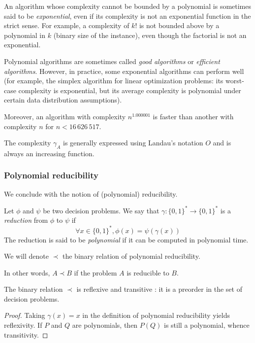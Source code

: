 An algorithm whose complexity cannot be bounded by a polynomial is sometimes said to be \textit{exponential}, even if its complexity is not an exponential function in the strict sense. For example, a complexity of $k!$ is not bounded above by a polynomial in $k$ (binary size of the instance), even though the factorial is not an exponential.

Polynomial algorithms are sometimes called \textit{good algorithms} or \textit{efficient algorithms}. However, in practice, some exponential algorithms can perform well (for example, the simplex algorithm for linear optimization problems: its worst-case complexity is exponential, but its average complexity is polynomial under certain data distribution assumptions).

Moreover, an algorithm with complexity $n^{1.000001}$ is faster than another with complexity $n$ for $n < 16\,626\,517$.

The complexity $\gamma_A$ is generally expressed using Landau’s notation $O$ and is always an increasing function.

\subsubsection{Polynomial reducibility}

We conclude with the notion of (polynomial) reducibility. 

\begin{definition}
    Let $ \phi $ and $ \psi $ be two decision problems. We say that $ \gamma : \{0,1\}^* \to \{0,1\}^* $ is a \textit{reduction} from $ \phi $ to $ \psi $ if 
    \[ 
        \forall x \in \{0,1\}^*, \phi(x) = \psi(\gamma(x))
    \]
    The reduction is said to be \textit{polynomial} if it can be computed in polynomial time.
\end{definition}

\begin{definition}
    We will denote $ \prec $ the binary relation of polynomial reducibility.
\end{definition}

In other words, $ A \prec B $ if the problem $ A $ is reducible to $ B $.

\begin{proposition}
    The binary relation $ \prec $ is reflexive and transitive : it is a preorder in the set of decision problems.
\end{proposition}

\begin{proof}
    Taking $ \gamma (x) = x $ in the definition of polynomial reducibility yields reflexivity. If $ P $ and $ Q $ are polynomials, then $ P(Q) $ is still a polynomial, whence transitivity.
\end{proof}

